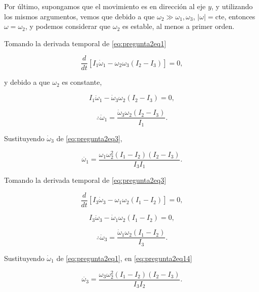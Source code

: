 \documentclass[a4paper,10pt]{article}
\numberwithin{equation}{section}
\begin{document}
Por último, supongamos que el movimiento es en dirección al eje $y$,  y utilizando los 
mismos argumentos, vemos que debido a que $\omega_2 \gg \omega_1,\omega_3$, 
$|\omega| = \text{cte}$, entonces $\omega = \omega_2$, y podemos considerar 
que $\omega_2$ es estable, al menos a primer orden. 

Tomando la derivada temporal de \eqref{eq:pregunta2eq1} 

\begin{equation}
 \frac{d}{dt}\left[I_1\dot{\omega}_1 - \omega_2\omega_3(I_2 - I_3) \right] = 0,
\end{equation}

y debido a que $\omega_2$ es constante, 

\begin{equation}
 I_1\ddot{\omega}_1 - \dot{\omega}_3\omega_2(I_2 - I_3) = 0,
\end{equation}

\begin{equation}
 \therefore \ddot{\omega}_1 = \frac{\dot{\omega}_3\omega_2(I_2-I_3)}{I_1}.
  \label{eq:pregunta2eq12}
\end{equation}

Sustituyendo $\dot{\omega}_3$ de \eqref{eq:pregunta2eq3}, 

\begin{equation}
 \ddot{\omega_1} = \frac{\omega_1\omega_2^2(I_1 - I_2)(I_2 - I_3)}{I_3I_1}.
 \label{eq:pregunta2eq13}
\end{equation}

Tomando la derivada temporal de \eqref{eq:pregunta2eq3} 

\begin{equation}
 \frac{d}{dt}\left[I_3\dot{\omega}_3 - \omega_1\omega_2(I_1 - I_2) \right] = 0,
\end{equation}

\begin{equation}
 I_3\ddot{\omega}_3 - \dot{\omega}_1\omega_2(I_1 - I_2) = 0,
\end{equation}

\begin{equation}
 \therefore \ddot{\omega}_3 = \frac{\dot{\omega}_1\omega_2(I_1-I_2)}{I_3}.
 \label{eq:pregunta2eq14}
\end{equation}

Sustituyendo $\dot{\omega}_1$ de \eqref{eq:pregunta2eq1}, en \eqref{eq:pregunta2eq14}

\begin{equation}
 \ddot{\omega_3} = \frac{\omega_3\omega_2^2(I_1 - I_2)(I_2- I_3)}{I_3I_2}.
 \label{eq:pregunta2eq15}
\end{equation}
\end{document}
